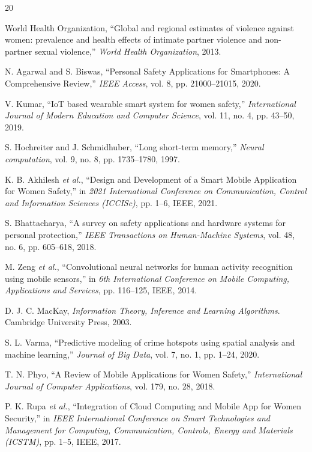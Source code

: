 \documentclass[10pt,journal,compsoc]{IEEEtran}
\begin{document}
\begin{thebibliography}{20}

World Health Organization, ``Global and regional estimates of violence against women: prevalence and health effects of intimate partner violence and non-partner sexual violence,'' \emph{World Health Organization}, 2013.

N. Agarwal and S. Biswas, ``Personal Safety Applications for Smartphones: A Comprehensive Review,'' \emph{IEEE Access}, vol. 8, pp. 21000--21015, 2020.

V. Kumar, ``IoT based wearable smart system for women safety,'' \emph{International Journal of Modern Education and Computer Science}, vol. 11, no. 4, pp. 43--50, 2019.

S. Hochreiter and J. Schmidhuber, ``Long short-term memory,'' \emph{Neural computation}, vol. 9, no. 8, pp. 1735--1780, 1997.

K. B. Akhilesh \emph{et al.}, ``Design and Development of a Smart Mobile Application for Women Safety,'' in \emph{2021 International Conference on Communication, Control and Information Sciences (ICCISc)}, pp. 1--6, IEEE, 2021.

S. Bhattacharya, ``A survey on safety applications and hardware systems for personal protection,'' \emph{IEEE Transactions on Human-Machine Systems}, vol. 48, no. 6, pp. 605--618, 2018.

M. Zeng \emph{et al.}, ``Convolutional neural networks for human activity recognition using mobile sensors,'' in \emph{6th International Conference on Mobile Computing, Applications and Services}, pp. 116--125, IEEE, 2014.

D. J. C. MacKay, \emph{Information Theory, Inference and Learning Algorithms}. Cambridge University Press, 2003.

S. L. Varma, ``Predictive modeling of crime hotspots using spatial analysis and machine learning,'' \emph{Journal of Big Data}, vol. 7, no. 1, pp. 1--24, 2020.

T. N. Phyo, ``A Review of Mobile Applications for Women Safety,'' \emph{International Journal of Computer Applications}, vol. 179, no. 28, 2018.

P. K. Rupa \emph{et al.}, ``Integration of Cloud Computing and Mobile App for Women Security,'' in \emph{IEEE International Conference on Smart Technologies and Management for Computing, Communication, Controls, Energy and Materials (ICSTM)}, pp. 1--5, IEEE, 2017.


\end{thebibliography}
\end{document}
